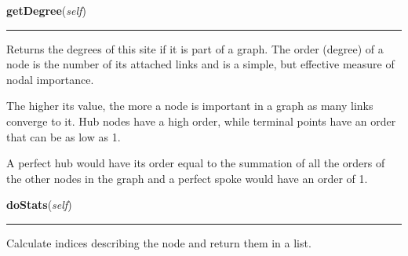     \begin{boxedminipage}{\textwidth}

    \raggedright \textbf{getDegree}(\textit{self})

    \vspace{-1.5ex}

    \rule{\textwidth}{0.5\fboxrule}
    Returns the degrees of this site if it is part of a graph. The order 
    (degree) of a node is the number of its attached links and is a simple,
    but effective measure of nodal importance.

    The higher its value, the more a node is important in a graph as many 
    links converge to it. Hub nodes have a high order, while terminal 
    points have an order that can be as low as 1.

    A perfect hub would have its order equal to the summation of all the 
    orders of the other nodes in the graph and a perfect spoke would have 
    an order of 1.

    \vspace{1ex}

    \end{boxedminipage}

    \label{Epigrass:simobj:siteobj:doStats}

    \vspace{0.5ex}

    \begin{boxedminipage}{\textwidth}

    \raggedright \textbf{doStats}(\textit{self})

    \vspace{-1.5ex}

    \rule{\textwidth}{0.5\fboxrule}
    Calculate indices describing the node and return them in a list.

    \vspace{1ex}

    \end{boxedminipage}

    \label{Epigrass:simobj:siteobj:getCentrality}

    \vspace{0.5ex}

